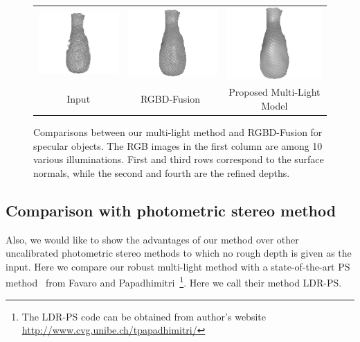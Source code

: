 \begin{figure}[!ht]
{\begin{tabular}{c|c c}
   \includegraphics[height = 0.24\linewidth]{figures/result/robust_vase_shape_init.pdf} 
   &
   \includegraphics[height = 0.24\linewidth]{figures/result/rgbd_vase_shape.pdf} &
   \includegraphics[height = 0.24\linewidth]{figures/result/robust_vase_shape.pdf}\\


   {Input} & {RGBD-Fusion~\cite{or2015rgbd}} & {Proposed Multi-Light Model}               
 \end{tabular}}
\caption{Comparisons between our multi-light method and RGBD-Fusion for specular objects. The RGB images in the first column are among 10 various illuminations. First and third rows correspond to the surface normals, while the second and fourth are the refined depths.}
\label{fig:comp_specular}
\end{figure}

\subsection{Comparison with photometric stereo method}
Also, we would like to show the advantages of our method over other uncalibrated photometric stereo methods to which no rough depth is given as the input.
Here we compare our robust multi-light method with a state-of-the-art PS method~\cite{favaro2012closed} from Favaro and Papadhimitri~\footnote{The LDR-PS code can be obtained from author's website \url{http://www.cvg.unibe.ch/tpapadhimitri/}}. 
Here we call their method LDR-PS.

